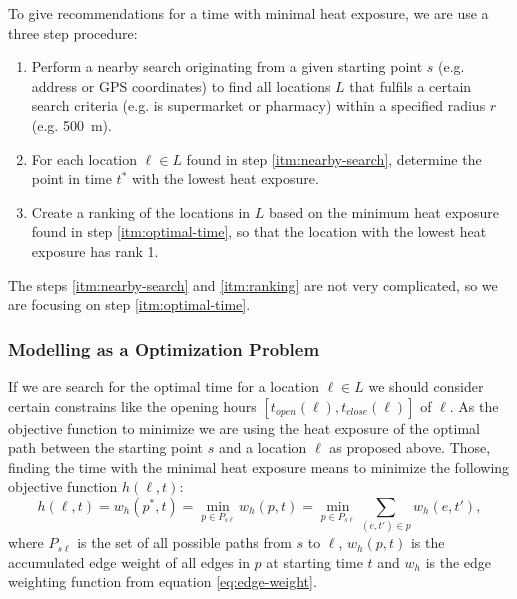  To give recommendations for a time with minimal heat exposure, we are use a three step procedure: 
 
 \begin{enumerate}
 	\item \label{itm:nearby-search} Perform a nearby search originating from a given starting point $s$  (e.g. address or GPS coordinates) to find all locations $L$ that fulfils a certain search criteria (e.g. is supermarket or pharmacy)  within a specified radius $r$ (e.g. \SI{500}{\meter}).
 	
 	\item \label{itm:optimal-time} For each location $\ell \in L$ found in step \ref{itm:nearby-search}, determine the point in time $t^*$ with the lowest heat exposure. 
 	
 	\item \label{itm:ranking} Create a ranking of the locations in $L$ based on the minimum heat exposure found in step \ref{itm:optimal-time}, so that the location with the lowest heat exposure has rank 1.
 \end{enumerate} 

The steps \ref{itm:nearby-search} and \ref{itm:ranking} are not very complicated, so we are focusing on step \ref{itm:optimal-time}. 

\subsubsection{Modelling as a Optimization Problem} 

If we are search for the optimal time for a location $\ell \in L$ we should consider certain constrains like the opening hours $[t_{open}(\ell),t_{close}(\ell)]$ of $\ell$. As the objective function to minimize we are using the heat exposure of the optimal path between the starting point $s$ and a location $\ell$ as proposed above. Those, finding the time with the minimal heat exposure means to minimize the following objective function $h(\ell, t)$:
	\begin{equation}\label{eq:objective-funtion}
		h(\ell, t) = w_h(p^*, t) = \min_{p\in P_{s\ell}} w_h(p, t) = \min_{p\in P_{s\ell}} \sum_{(e, t') \in p} w_h(e, t'),
	\end{equation}
where $P_{s\ell}$ is the set of all possible paths from $s$ to $\ell$,  $w_h(p, t)$ is the accumulated edge weight of all edges in $p$ at starting time $t$ and $w_h$ is the edge weighting function from equation \eqref{eq:edge-weight}. 

